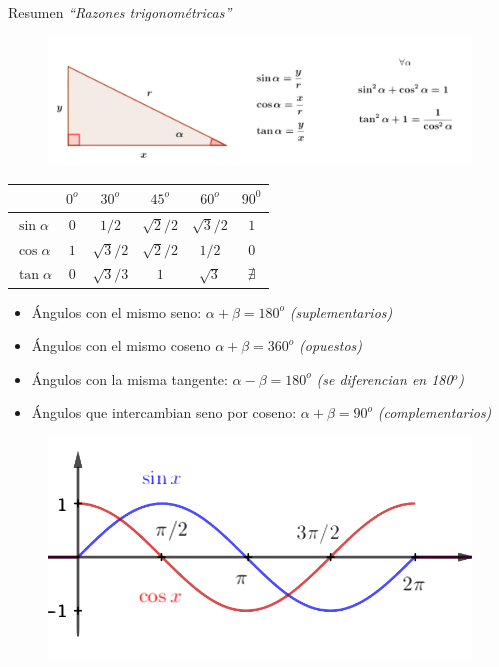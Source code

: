\begin{myblock}{Resumen \emph{``Razones trigonométricas''}}
\begin{figure}[H]
	\centering
	\includegraphics[width=1\textwidth]{img-rt/rt40.png}
\end{figure}	

\begin{table}[H]
\centering
\begin{tabular}{l|c|c|c|c|c|}
\cline{2-6}
 & $0^o$ & $30^o$ & $45^o$ & $60^o$ & $90^0$ \\ \hline
\multicolumn{1}{|l|}{$\sin \alpha$}  & $0$ & $1/2$ & $\sqrt{2}/2$ & $\sqrt{3}/2$ & $1$ \\ \hline
\multicolumn{1}{|l|}{$\cos \alpha$} & $1$ & $\sqrt{3}/2$ & $\sqrt{2}/2$ & $1/2$ & $0$ \\ \hline
\multicolumn{1}{|l|}{$\tan \alpha$} & $0$ & $\sqrt{3}/3$ & $1$ & $\sqrt{3}$ & $\nexists$ \\ \hline
\end{tabular}
\end{table}

\begin {itemize}
\vspace{-2mm}\item Ángulos con el mismo seno: $\alpha+\beta=180^o$ \hfill   \emph{(suplementarios)}
\vspace{-2mm}\item Ángulos con el mismo coseno $\alpha+\beta=360^o$ \hfill  \emph{(opuestos)}
\vspace{-2mm}\item Ángulos con la misma tangente: $\alpha-\beta=180^o$ \hfill  \emph{(se diferencian en 180$^o$)}
\vspace{-2mm}\item Ángulos que intercambian seno por coseno: $\alpha+\beta=90^o$ \hfill  \emph{(complementarios)}
\end {itemize}

\begin{figure}[H]
	\centering
	\includegraphics[width=.6\textwidth]{img-rt/rt39.png}
\end{figure}	
\end{myblock}












